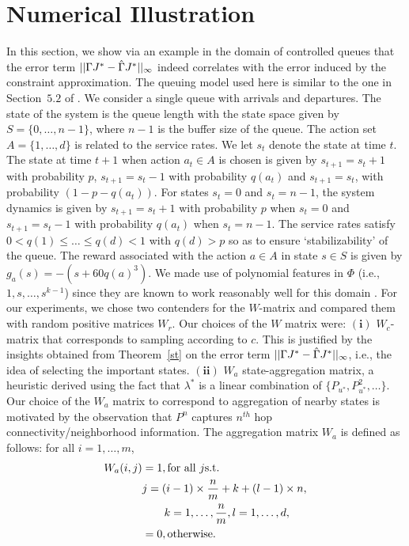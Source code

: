\section{Numerical Illustration}
In this section, we show via an example in the domain of controlled queues that the error term $||\Gamma J^*-\hat{\Gamma} J^*||_\infty$ indeed correlates with
 the error induced by the constraint approximation. The queuing model used here is similar to the one in Section~$5.2$ of \cite{ALP}. We consider a single queue with arrivals and departures. The state of the system is the queue length with the state space given by $S=\{0,\ldots,n-1\}$, where $n-1$ is the buffer size of the queue. The action set $A=\{1,\ldots,d\}$ is related to the service rates. We let $s_t$ denote the state at time $t$. The state at time $t+1$ when action $a_t \in A $ is chosen is given by $s_{t+1}= s_{t}+1$ with probability $p$, $s_{t+1}= s_{t}-1$ with probability $q(a_t)$ and $s_{t+1}= s_t$, with probability $(1-p-q(a_t))$. For states $s_t=0$ and $s_t=n-1$, the system dynamics is given by 	$s_{t+1}= s_{t}+1$ with probability $p$ when $s_t=0$ and $s_{t+1}=s_t-1$ with probability $q(a_t)$ when $s_t=n-1$. The service rates satisfy $0<q(1)\leq \ldots\leq q(d)<1$ with $q(d)>p$ so as to ensure `stabilizability' of the queue. The reward associated with the action $a \in A$ in state $s\in S$ is given by $g_a(s)=-(s+60q(a)^3)$. We made use of polynomial features in $\Phi$ (i.e., $1,s,\ldots,s^{k-1}$) since they are known to work reasonably well for this domain \cite{ALP}.
For our experiments, we chose two contenders for the $W$-matrix and compared them with random positive matrices $W_r$. Our choices of the $W$ matrix were: {$\mathbf{(i)}$} $W_c$- matrix that corresponds to sampling according to $c$. This is justified by the insights obtained from Theorem~\ref{st} on the error term $||\Gamma J^*-\hat{\Gamma} J^*||_\infty$, i.e., the idea of selecting the important states. {$\mathbf{(ii)}$} $W_a$ state-aggregation matrix, a heuristic derived using the fact that $\lambda^*$ is a linear combination of $\{P_{u^*},P^2_{u^*},\ldots\}$. Our choice of the $W_a$ matrix to correspond to aggregation of nearby states is motivated by the observation that $P^n$ captures $n^{th}$ hop connectivity/neighborhood information. 
The aggregation matrix $W_a$ is defined as follows: for all $ i=1,\ldots,m$,
\begin{align}\label{wdes}
W_a(i,j)&=1, \mb\text{for all } j\mb\text{s.t.}\mb \nn\\&j=(i-1)\times\frac{n}{m}+k+(l-1)\times n, \nn\\&\mb\quad\quad k=1,\ldots,\frac{n}{m}, l=1,\ldots,d,\nn\\
&=0,\mb\text{otherwise}.
\end{align}
